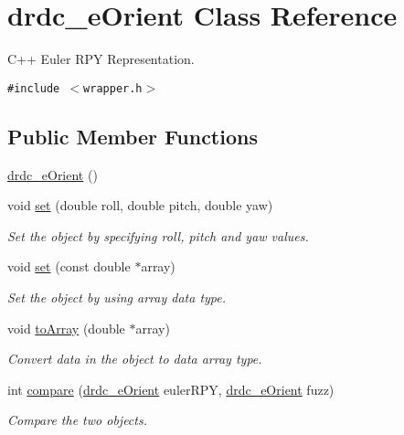 \hypertarget{classdrdc__eOrient}{
\section{drdc\_\-eOrient Class Reference}
\label{classdrdc__eOrient}
}
C++ Euler RPY Representation.  


{\tt \#include $<$wrapper.h$>$}

\subsection*{Public Member Functions}
\begin{CompactItemize}
\item 
\hyperlink{classdrdc__eOrient_c14573d35fe035bb2416bff9d1ed9415}{drdc\_\-eOrient} ()
\item 
void \hyperlink{classdrdc__eOrient_61d95b384837cbdbbbef12cea797836c}{set} (double roll, double pitch, double yaw)
\begin{CompactList}\small\item\em Set the object by specifying roll, pitch and yaw values. \item\end{CompactList}\item 
void \hyperlink{classdrdc__eOrient_e7d394328dd13bee772409963493428c}{set} (const double $\ast$array)
\begin{CompactList}\small\item\em Set the object by using array data type. \item\end{CompactList}\item 
void \hyperlink{classdrdc__eOrient_71f23a163c4c273417c68d4ffe8cb46f}{toArray} (double $\ast$array)
\begin{CompactList}\small\item\em Convert data in the object to data array type. \item\end{CompactList}\item 
int \hyperlink{classdrdc__eOrient_566075263f078ae4f17560cb7a74fb6a}{compare} (\hyperlink{classdrdc__eOrient}{drdc\_\-eOrient} eulerRPY, \hyperlink{classdrdc__eOrient}{drdc\_\-eOrient} fuzz)
\begin{CompactList}\small\item\em Compare the two objects. \item\end{CompactList}\item 

\end{CompactItemize}
